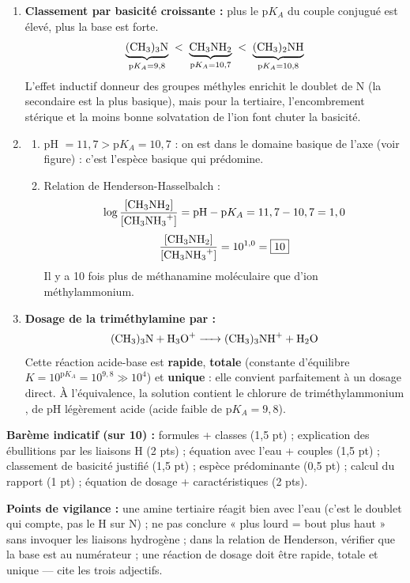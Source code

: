 \documentclass[11pt]{article}
\begin{document}
\begin{corrige}
\begin{enumerate}
\item \textbf{Classement par basicité croissante :} plus le p$K_A$ du couple conjugué est élevé, plus la base est forte.
\[ \underbrace{\ce{(CH3)3N}}_{\text{p}K_A = 9,8} \;<\; \underbrace{\ce{CH3NH2}}_{\text{p}K_A = 10,7} \;<\; \underbrace{\ce{(CH3)2NH}}_{\text{p}K_A = 10,8} \]
L'effet inductif donneur des groupes méthyles enrichit le doublet de N (la secondaire est la plus basique), mais pour la tertiaire, l'encombrement stérique et la moins bonne solvatation de l'ion  font chuter la basicité.
\item \begin{enumerate}
\item pH $= 11,7 > \text{p}K_A = 10,7$ : on est dans le domaine basique de l'axe (voir figure) : c'est l'espèce basique \textbf{} qui prédomine.
\item Relation de Henderson-Hasselbalch :
\[ \log\frac{[\ce{CH3NH2}]}{[\ce{CH3NH3+}]} = \text{pH} - \text{p}K_A = 11,7 - 10,7 = 1,0 \]
\[ \frac{[\ce{CH3NH2}]}{[\ce{CH3NH3+}]} = 10^{1,0} = \boxed{10} \]
Il y a 10 fois plus de méthanamine moléculaire que d'ion méthylammonium.
\end{enumerate}
\item \textbf{Dosage de la triméthylamine par  :} \[ \ce{(CH3)3N + H3O+ -> (CH3)3NH+ + H2O} \] Cette réaction acide-base est \textbf{rapide}, \textbf{totale} (constante d'équilibre $K = 10^{\text{p}K_A} = 10^{9,8} \gg 10^4$) et \textbf{unique} : elle convient parfaitement à un dosage direct. À l'équivalence, la solution contient le chlorure de triméthylammonium , de pH légèrement acide (acide faible de p$K_A = 9,8$).
\end{enumerate}
\medskip
\textbf{Barème indicatif (sur 10) :} formules + classes (1,5 pt) ; explication des ébullitions par les liaisons H (2 pts) ; équation avec l'eau + couples (1,5 pt) ; classement de basicité justifié (1,5 pt) ; espèce prédominante (0,5 pt) ; calcul du rapport (1 pt) ; équation de dosage + caractéristiques (2 pts).
\medskip

\textbf{Points de vigilance :} une amine tertiaire réagit bien avec l'eau (c'est le doublet qui compte, pas le H sur N) ; ne pas conclure « plus lourd = bout plus haut » sans invoquer les liaisons hydrogène ; dans la relation de Henderson, vérifier que la base est au numérateur ; une réaction de dosage doit être rapide, totale et unique — cite les trois adjectifs.
\end{corrige}
\end{document}
